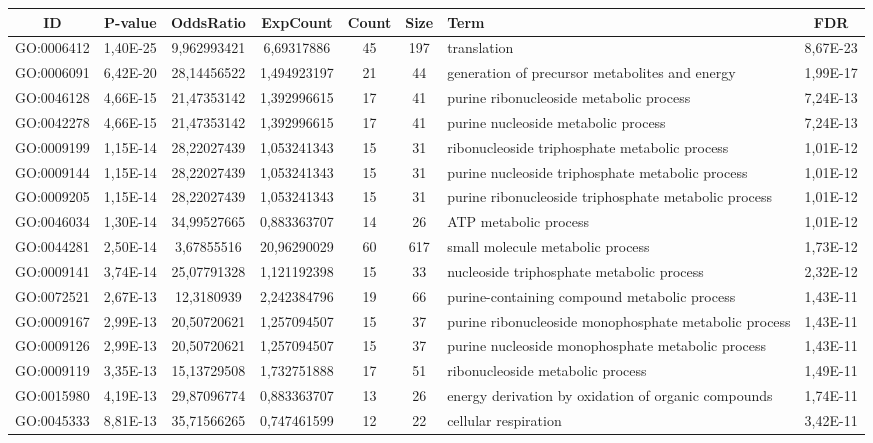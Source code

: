 \documentclass[12pt, a4paper]{report}
\begin{document}
\begin{table}[H]
	\centering
	\tiny
	\begin{tabular}{c|c|c|c|c|c|p{4cm}|c}
		\textbf{ID}&\textbf{P-value}&\textbf{OddsRatio}&\textbf{ExpCount}&\textbf{Count}&\textbf{Size}& \textbf{Term}&\textbf{FDR}\\
		\hline
GO:0006412&	1,40E-25&	9,962993421&	6,69317886&	45&	197&	translation&	8,67E-23\\
GO:0006091&	6,42E-20&	28,14456522&	1,494923197&	21&	44&	generation of precursor metabolites and energy&	1,99E-17\\
GO:0046128&	4,66E-15&	21,47353142&	1,392996615&	17&	41&	purine ribonucleoside metabolic process&	7,24E-13\\
GO:0042278&	4,66E-15&	21,47353142&	1,392996615&	17&	41&	purine nucleoside metabolic process&	7,24E-13\\
GO:0009199&	1,15E-14&	28,22027439&	1,053241343&	15&	31&	ribonucleoside triphosphate metabolic process&	1,01E-12\\
GO:0009144&	1,15E-14&	28,22027439&	1,053241343&	15&	31&	purine nucleoside triphosphate metabolic process&	1,01E-12\\
GO:0009205&	1,15E-14&	28,22027439&	1,053241343&	15&	31&	purine ribonucleoside triphosphate metabolic process&	1,01E-12\\
GO:0046034&	1,30E-14&	34,99527665&	0,883363707&	14&	26&	ATP metabolic process&	1,01E-12\\
GO:0044281&	2,50E-14&	3,67855516&	20,96290029&	60&	617&	small molecule metabolic process&	1,73E-12\\
GO:0009141&	3,74E-14&	25,07791328&	1,121192398&	15&	33&	nucleoside triphosphate metabolic process&	2,32E-12\\
GO:0072521&	2,67E-13&	12,3180939&	2,242384796&	19&	66&	purine-containing compound metabolic process&	1,43E-11\\
GO:0009167&	2,99E-13&	20,50720621&	1,257094507&	15&	37&	purine ribonucleoside monophosphate metabolic process&	1,43E-11\\
GO:0009126&	2,99E-13&	20,50720621&	1,257094507&	15&	37&	purine nucleoside monophosphate metabolic process&	1,43E-11\\
GO:0009119&	3,35E-13&	15,13729508&	1,732751888&	17&	51&	ribonucleoside metabolic process&	1,49E-11\\
GO:0015980&	4,19E-13&	29,87096774&	0,883363707&	13&	26&	energy derivation by oxidation of organic compounds&	1,74E-11\\
GO:0045333&	8,81E-13&	35,71566265&	0,747461599&	12&	22&	cellular respiration&	3,42E-11\\

\end{tabular}
\end{table}
\end{document}
